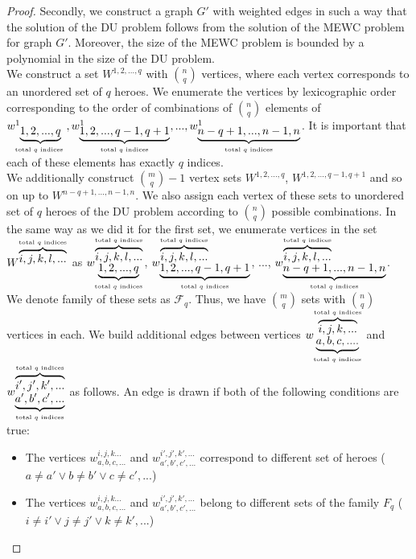 \documentclass[smallextended]{svjour3}       %
\begin{document}
\begin{proof}
Secondly, we construct a graph $G'$ with weighted edges in such a way that the solution of the DU problem follows from the solution of the MEWC problem for graph $G'$. Moreover, the size of the MEWC problem is bounded by a polynomial in the size of the DU problem.\\
    We construct a set $W^{1,2,...,q} $ with $\binom{n}{q} $ vertices, where each vertex corresponds to an unordered set of $q$ heroes. We enumerate the vertices by lexicographic order corresponding to the order of combinations of $ \binom {n}{q} $ elements of $ w^1_ {\underbrace {1,2, ..., q}_\text{total $ q $ indices }}, w^1_{\underbrace {1,2, ..., q-1, q + 1}_\text {total $ q $ indices}}, ..., w^1_ {\underbrace{n-q+1, ..., n-1, n}_\text{total $ q $ indices}} $. It is important that each of these elements has exactly $q$ indices.\\
We additionally construct $ \binom{m}{q}-1 $ vertex sets $ W^{1,2, ..., q} $, $W^{1,2,...,q-1, q + 1} $ and so on up to $ W^{n-q + 1, ..., n-1, n} $. We also assign each vertex of these sets to unordered set of $q$ heroes of the DU problem according to $\binom{n}{q}$ possible combinations. In the same way as we did it for the first set, we enumerate vertices in the set $W^{\overbrace {i, j, k, l, ...}^\text {total $ q $ indices}} $ as $w_{\underbrace {1,2, ..., q}_\text {total $ q $ indices}}^{\overbrace{i, j, k, l, ...}^\text{total $ q $ indices}} $, $w_{ \underbrace {1,2, ..., q-1, q + 1}_\text{total $ q $ indices}}^{\overbrace{i, j, k, l, ...} ^\text{total $ q $ indices}} $,  ..., $w_{\underbrace {n-q + 1, ..., n-1, n}_\text{total $ q $ indices}}^{\overbrace { i, j, k, l, ...}^\text {total $ q $ indices}} $.\\
    We denote family of these sets as $ \mathcal{F}_q $. Thus, we have $ \binom{m}{q} $ sets with $ \binom{n}{q} $ vertices in each.
    We build additional edges between vertices $w_{\underbrace{a, b, c, ....}_\text{total $ q $ indices}}^{\overbrace{i, j, k , ...}^\text{total $ q $ indices}} $ and $w_{\underbrace{a',b', c', ...}_\text{total $ q $ indices}}^{\overbrace {i ', j', k ', ...}^\text{total $ q $ indices}}$ as follows. An edge is drawn if both of the following conditions are true:
    \begin{itemize}
        \item The vertices $w_{a, b, c, ...}^{i, j, k ...} $ and $ w_{a', b', c', ...}^{i', j', k', ...}$ correspond to different set of heroes ($ a \neq a '\lor b \neq b' \lor c \neq c', ... $)
        \item The vertices $ w_{a, b, c, ...}^ {i, j, k ...} $ and $ w_{a', b', c',...}^{i', j', k', ...} $ belong to different sets of the family $ F_q $ ($ i \neq i'\lor j \neq j' \lor k \neq k', ... $)

\end{itemize}
\end{proof}
\end{document}
